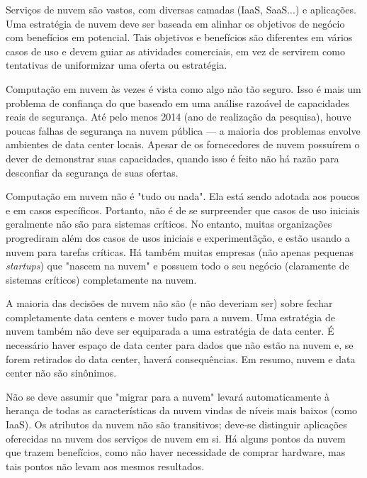\begin{enumerate}
		Serviços de nuvem são vastos, com diversas camadas (IaaS, SaaS...) e 
		aplicações. Uma estratégia de nuvem deve ser baseada em alinhar os objetivos 
		de negócio com benefícios em potencial. Tais objetivos e benefícios são 
		diferentes em vários casos de uso e devem guiar as atividades comerciais, em 
		vez de servirem como tentativas de uniformizar uma oferta ou estratégia.

		Computação em nuvem às vezes é vista como algo não tão seguro. Isso é mais 
		um problema de confiança do que baseado em uma análise razoável de 
		capacidades reais de segurança. Até pelo menos 2014 (ano de realização da 
		pesquisa), houve poucas falhas de segurança na nuvem pública --- a maioria 
		dos problemas envolve ambientes de data center locais. Apesar 
		de os fornecedores de nuvem possuírem o dever de demonstrar suas capacidades, 
		quando isso é feito não há razão para desconfiar da segurança de suas 
		ofertas.

		Computação em nuvem não é "tudo ou nada". Ela está sendo adotada aos poucos 
		e em casos específicos. Portanto, não é de se surpreender que casos de uso 
		iniciais geralmente não são para sistemas críticos. No entanto, muitas 
		organizações progrediram além dos casos de usos iniciais e experimentãção, e 
		estão usando a nuvem para tarefas críticas. Há também muitas empresas (não 
		apenas pequenas \emph{startups}) que "nascem na nuvem" e possuem todo o seu 
		negócio (claramente de sistemas críticos) completamente na nuvem.

		A maioria das decisões de nuvem não são (e não deveriam ser) sobre fechar 
		completamente data centers e mover tudo para a nuvem. Uma estratégia de 
		nuvem também não deve ser equiparada a uma estratégia de data center. É 
		necessário haver espaço de data center para dados que não estão na nuvem e, 
		se forem retirados do data center, haverá consequências. Em resumo, nuvem e 
		data center não são sinônimos.

		Não se deve assumir que "migrar para a nuvem" levará automaticamente à 
		herança de todas as características da nuvem vindas de níveis mais baixos 
		(como IaaS). Os atributos da nuvem não são transitivos; deve-se distinguir 
		aplicações oferecidas na nuvem dos serviços de nuvem em si. Há alguns pontos 
		da nuvem que trazem benefícios, como não haver necessidade de comprar 
		hardware, mas tais pontos não levam aos mesmos resultados.


\end{enumerate}
